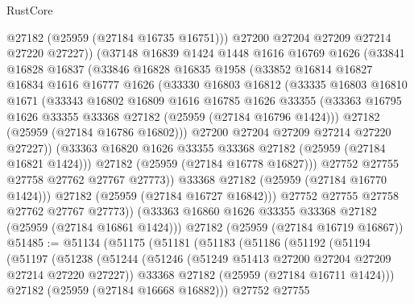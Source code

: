 \begin{lexlean}{RustCore}
\begin{coremodule}
                @27182
                (@25959 (@27184 @16735 @16751)))
              @27200
              @27204
              @27209
              @27214
              @27220
              @27227))
          (@37148
            @16839
            @1424
            @1448
            @1616
            @16769
            @1626
            (@33841
              @16828
              @16837
              (@33846
                @16828
                @16835
                @1958
                (@33852
                  @16814
                  @16827
                  @16834
                  @1616
                  @16777
                  @1626
                  (@33330
                    @16803
                    @16812
                    (@33335
                      @16803
                      @16810
                      @1671
                      (@33343
                        @16802
                        @16809
                        @1616
                        @16785
                        @1626
                        @33355
                        (@33363 @16795 @1626 @33355 @33368 @27182 (@25959 (@27184 @16796 @1424)))
                        @27182
                        (@25959 (@27184 @16786 @16802)))
                      @27200
                      @27204
                      @27209
                      @27214
                      @27220
                      @27227))
                  (@33363 @16820 @1626 @33355 @33368 @27182 (@25959 (@27184 @16821 @1424)))
                  @27182
                  (@25959 (@27184 @16778 @16827)))
                @27752
                @27755
                @27758
                @27762
                @27767
                @27773))
            @33368
            @27182
            (@25959 (@27184 @16770 @1424)))
          @27182
          (@25959 (@27184 @16727 @16842)))
        @27752
        @27755
        @27758
        @27762
        @27767
        @27773))
    (@33363 @16860 @1626 @33355 @33368 @27182 (@25959 (@27184 @16861 @1424)))
    @27182
    (@25959 (@27184 @16719 @16867))
@51485 := @51134
    (@51175
      (@51181
        (@51183
          (@51186
            (@51192
              (@51194
                (@51197
                  (@51238
                    (@51244
                      (@51246 (@51249 @51413 @27200 @27204 @27209 @27214 @27220 @27227))
                      @33368
                      @27182
                      (@25959 (@27184 @16711 @1424)))
                    @27182
                    (@25959 (@27184 @16668 @16882)))
                  @27752
                  @27755

\end{coremodule}
\end{lexlean}

